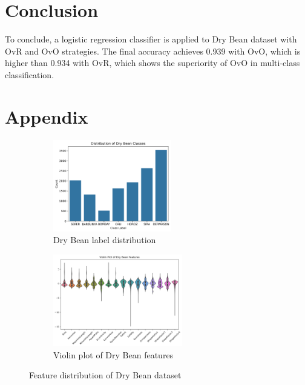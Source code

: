 \documentclass[12pt,a4paper]{article}
\begin{document}
\section{Conclusion}\label{sec:conclusion}
To conclude, a logistic regression classifier is applied to Dry Bean dataset with OvR and OvO strategies. The final accuracy achieves 0.939 with OvO, which is higher than 0.934 with OvR, which shows the superiority of OvO in multi-class classification.

\printbibliography

\section{Appendix}\label{sec:appendix}
\begin{figure}[h]
    \centering
    \begin{subfigure}{0.48\textwidth}
        \centering
        \includegraphics[width=\linewidth, height=4cm]{figures/dry_bean_class_distribution.png}
        \caption{Dry Bean label distribution}
        \label{fig:label_distribution}
    \end{subfigure}
    \hfill
    \begin{subfigure}{0.48\textwidth}
        \centering
        \includegraphics[width=\linewidth, height=4cm]{figures/dry_bean_violin.png}
        \caption{Violin plot of Dry Bean features}
        \label{fig:dry_bean_violin}
    \end{subfigure}
    \caption{Feature distribution of Dry Bean dataset}
    \label{fig:iris_features}
\end{figure}
\end{document}
